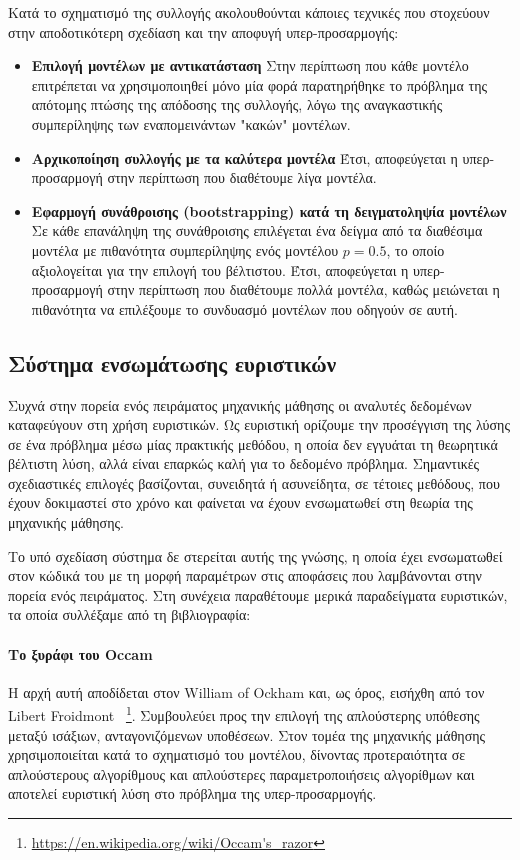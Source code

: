Κατά το σχηματισμό της συλλογής ακολουθούνται κάποιες τεχνικές που στοχεύουν στην αποδοτικότερη σχεδίαση και την αποφυγή υπερ-προσαρμογής:
\begin{itemize}
	\item \textbf{Επιλογή μοντέλων με αντικατάσταση} Στην περίπτωση που κάθε μοντέλο επιτρέπεται να χρησιμοποιηθεί μόνο μία φορά παρατηρήθηκε το πρόβλημα της απότομης πτώσης της απόδοσης της συλλογής, λόγω της αναγκαστικής συμπερίληψης των εναπομεινάντων "κακών" μοντέλων. 
	\item \textbf{Αρχικοποίηση συλλογής με τα καλύτερα μοντέλα} Έτσι, αποφεύγεται η υπερ-προσαρ\-μογή στην περίπτωση που διαθέτουμε λίγα μοντέλα.
	\item \textbf{Εφαρμογή συνάθροισης (bootstrapping) κατά τη δειγματοληψία μοντέλων} Σε κάθε επανάληψη της συνάθροισης επιλέγεται ένα δείγμα από τα διαθέσιμα μοντέλα με πιθανότητα συμπερίληψης ενός μοντέλου $p=0.5$, το οποίο αξιολογείται για την επιλογή του βέλτιστου. Έτσι, αποφεύγεται η υπερ-προσαρμογή στην περίπτωση που διαθέτουμε πολλά μοντέλα, καθώς μειώνεται η πιθανότητα να επιλέξουμε το συνδυασμό μοντέλων που οδηγούν σε αυτή.
\end{itemize} 
\subsection{Σύστημα ενσωμάτωσης ευριστικών}
Συχνά στην πορεία ενός πειράματος μηχανικής μάθησης οι αναλυτές δεδομένων καταφεύγουν στη χρήση ευριστικών. Ως ευριστική ορίζουμε την προσέγγιση της λύσης σε ένα πρόβλημα μέσω μίας πρακτικής μεθόδου, η οποία δεν εγγυάται τη θεωρητικά βέλτιστη λύση, αλλά είναι επαρκώς καλή για το δεδομένο πρόβλημα. Σημαντικές σχεδιαστικές επιλογές βασίζονται, συνειδητά ή ασυνείδητα, σε τέτοιες μεθόδους, που έχουν δοκιμαστεί στο χρόνο και φαίνεται να έχουν ενσωματωθεί στη θεωρία της μηχανικής μάθησης.

Το υπό σχεδίαση σύστημα δε στερείται αυτής της γνώσης, η οποία έχει ενσωματωθεί στον κώδικά του με τη μορφή παραμέτρων στις αποφάσεις που λαμβάνονται στην πορεία ενός πειράματος. Στη συνέχεια παραθέτουμε μερικά παραδείγματα ευριστικών, τα οποία συλλέξαμε από τη βιβλιογραφία:

\paragraph{Το ξυράφι του Occam} Η αρχή αυτή αποδίδεται στον William of Ockham και, ως όρος, εισήχθη από τον Libert Froidmont ~\footnote{\url{https://en.wikipedia.org/wiki/Occam's\_razor}}. Συμβουλεύει προς την επιλογή της απλούστερης υπόθεσης μεταξύ ισάξιων, ανταγονιζόμενων υποθέσεων. Στον τομέα της μηχανικής μάθησης χρησιμοποιείται κατά το σχηματισμό του μοντέλου, δίνοντας προτεραιότητα σε απλούστερους αλγορίθμους και απλούστερες παραμετροποιήσεις αλγορίθμων και αποτελεί ευριστική λύση στο πρόβλημα της υπερ-προσαρμογής. 

